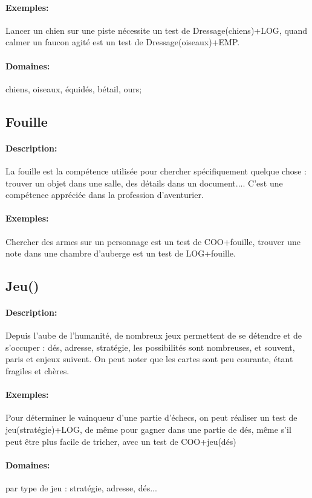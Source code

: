 \documentclass[10pt,a4paper,twocolumn]{book}
\begin{document}
\paragraph{Exemples:}Lancer un chien sur une piste nécessite un test de Dressage(chiens)+LOG, quand calmer un faucon agité est un test de Dressage(oiseaux)+EMP.
\paragraph{Domaines:}chiens, oiseaux, équidés, bétail, ours;
\subsection{Fouille}
\paragraph{Description:}La fouille est la compétence utilisée pour chercher spécifiquement quelque chose : trouver un objet dans une salle, des détails dans un document.... C'est une compétence appréciée dans la profession d'aventurier.
\paragraph{Exemples:}Chercher des armes sur un personnage est un test de COO+fouille, trouver une note dans une chambre d'auberge est un test de LOG+fouille. 
\subsection{Jeu()}
\paragraph{Description:}Depuis l'aube de l'humanité, de nombreux jeux permettent de se détendre et de s'occuper : dés, adresse, stratégie, les possibilités sont nombreuses, et souvent, paris et enjeux suivent. On peut noter que les cartes sont peu courante, étant fragiles et chères.
\paragraph{Exemples:}Pour déterminer le vainqueur d'une partie d'échecs, on peut réaliser un test de jeu(stratégie)+LOG, de même pour gagner dans une partie de dés, même s'il peut être plus facile de tricher, avec un test de COO+jeu(dés)
\paragraph{Domaines:}par type de jeu : stratégie, adresse, dés...
\end{document}
